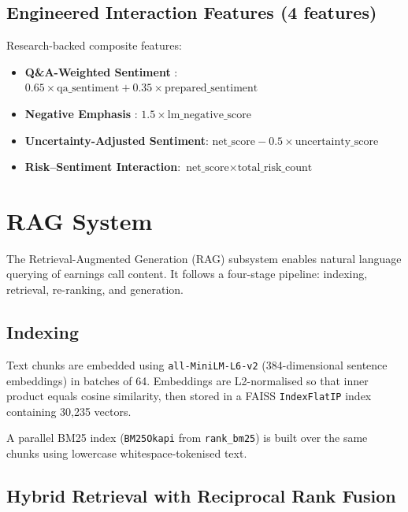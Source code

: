 \documentclass[12pt,a4paper]{article}
\begin{document}
\subsection{Engineered Interaction Features (4 features)}

Research-backed composite features:
\begin{itemize}[noitemsep]
    \item \textbf{Q\&A-Weighted Sentiment} \citep{price2012earnings}: $0.65 \times \text{qa\_sentiment} + 0.35 \times \text{prepared\_sentiment}$
    \item \textbf{Negative Emphasis} \citep{loughran2011liability}: $1.5 \times \text{lm\_negative\_score}$
    \item \textbf{Uncertainty-Adjusted Sentiment}: $\text{net\_score} - 0.5 \times \text{uncertainty\_score}$
    \item \textbf{Risk--Sentiment Interaction}: $\text{net\_score} \times \text{total\_risk\_count}$
\end{itemize}


\section{RAG System}
\label{sec:rag}

The Retrieval-Augmented Generation (RAG) subsystem enables natural language querying of earnings call content. It follows a four-stage pipeline: indexing, retrieval, re-ranking, and generation.

\subsection{Indexing}

Text chunks are embedded using \texttt{all-MiniLM-L6-v2} (384-dimensional sentence embeddings) in batches of 64. Embeddings are L2-normalised so that inner product equals cosine similarity, then stored in a FAISS \texttt{IndexFlatIP} index containing 30,235 vectors.

A parallel BM25 index (\texttt{BM25Okapi} from \texttt{rank\_bm25}) is built over the same chunks using lowercase whitespace-tokenised text.

\subsection{Hybrid Retrieval with Reciprocal Rank Fusion}
\end{document}
